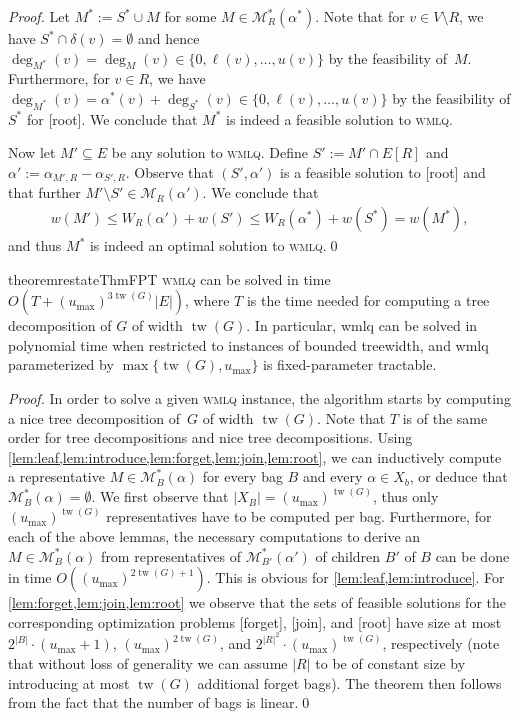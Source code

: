 \documentclass{llncs}
\newcommand{\tw}{\operatorname{tw}}
\begin{document}
\begin{proof}
Let $M^* := S^* \cup M$ for some $M \in \mathcal{M}^*_R(\alpha^*)$. Note that for $v \in V \setminus R$, we have $S^* \cap \delta(v) = \emptyset$ and hence $\deg_{M^*}(v) = \deg_M(v) \in \{0, \ell(v), \dots, u(v)\}$ by the feasibility of~$M$. Furthermore, for $v \in R$, we have $\deg_{M^*}(v) = \alpha^*(v) + \deg_{S^*}(v) \in \{0, \ell(v), \dots, u(v)\}$ by the feasibility of $S^*$ for [root]. We conclude that $M^*$ is indeed a feasible solution to \textsc{wmlq}.

Now let $M' \subseteq E$ be any solution to \textsc{wmlq}.
Define $S' := M' \cap E[R]$ and $\alpha' := \alpha_{M',R} - \alpha_{S',R}$. Observe that $(S', \alpha')$ is a feasible solution to [root] and that further $M' \setminus S' \in \mathcal{M}_R(\alpha')$.
We conclude that 
\begin{align*}
  w(M') \leq W_R(\alpha') + w(S') \leq W_R(\alpha^*) + w(S^*) = w(M^*),
\end{align*}
and thus $M^*$ is indeed an optimal solution to \textsc{wmlq}.\qed
\end{proof}

\begin{restatable}{theorem}{restateThmFPT}
\label{th:bounded_tw}
\textsc{wmlq} can be solved in time $O(T + (u_{\max})^{3\tw(G)}|E|)$, where $T$ is the time needed for computing a tree decomposition of $G$ of width $\tw(G)$. In particular, {\sc wmlq} can be solved in polynomial time when restricted to instances of bounded treewidth, and {\sc wmlq} parameterized by $\max\{\tw(G), u_{\max}\}$ is fixed-parameter tractable. 
\end{restatable}

\begin{proof} 
  In order to solve a given \textsc{wmlq} instance, the algorithm starts by computing a nice tree decomposition of~$G$ of width $\tw(G)$.  Note that $T$ is of the same order for tree decompositions and nice tree decompositions. Using \cref{lem:leaf,lem:introduce,lem:forget,lem:join,lem:root}, we can inductively compute a representative $M \in \mathcal{M}^*_B(\alpha)$ for every bag $B$ and every $\alpha \in X_b$, or deduce that $\mathcal{M}^*_B(\alpha) = \emptyset$. We first observe that $|X_B| = (u_{\max})^{\tw(G)}$, thus only $(u_{\max})^{\tw(G)}$ representatives have to be computed per bag. Furthermore, for each of the above lemmas, the necessary computations to derive an $M \in \mathcal{M}^*_B(\alpha)$ from representatives of $\mathcal{M}^*_{B'}(\alpha')$ of children $B'$ of $B$ can be done in time $O((u_{\max})^{2\tw(G) + 1})$. This is obvious for \cref{lem:leaf,lem:introduce}. For \cref{lem:forget,lem:join,lem:root} we observe that the sets of feasible solutions for the corresponding optimization problems [forget], [join], and [root] have size at most $2^{|B|} \cdot (u_{\max} + 1)$,  $(u_{\max})^{2\tw(G)}$, and $2^{|R|^2} \cdot (u_{\max})^{\tw(G)}$, respectively (note that without loss of generality we can assume $|R|$ to be of constant size by introducing at most $\tw(G)$ additional forget bags). The theorem then follows from the fact that the number of bags is linear.\qed
\end{proof}
\end{document}
